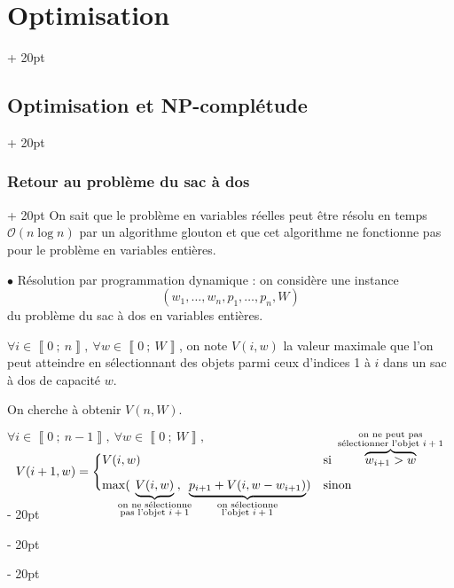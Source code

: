 \documentclass[a4paper, 12pt, twoside]{article}
\newcommand{\nset}[2]{\left\llbracket #1\ ;\ #2 \right\rrbracket}
\newcommand{\ind}[1][20pt]{\advance\leftskip + #1}
\newcommand{\deind}[1][20pt]{\advance\leftskip - #1}
\newenvironment{indt}[2][20pt]{#2 \par \ind[#1]}{\par \deind} %
\newcommand{\1}{\mathbbm 1}
\begin{document}
\begin{indt}{\section{Optimisation}}
\begin{indt}{\subsection{Optimisation et \textbf{NP}-complétude}}
            \vspace{12pt}
            
            \begin{indt}{\subsubsection{Retour au problème du sac à dos}}
                On sait que le problème en variables réelles peut être résolu en temps $\mathcal O(n\log n)$ par un algorithme glouton et que cet algorithme ne fonctionne pas pour le problème en variables entières.

                \vspace{12pt}
                
                $\bullet$ Résolution par programmation dynamique : on considère une instance
                \[
                    (w_1, \ldots, w_n, p_1, \ldots, p_n, W)
                \]
                du problème du sac à dos en variables entières.

                $\forall i \in \nset 0 n,\ \forall w \in \nset 0 W$, on note $V(i, w)$ la valeur maximale que l'on peut atteindre en sélectionnant des objets parmi ceux d'indices 1 à $i$ dans un sac à dos de capacité $w$.

                On cherche à obtenir $V(n, W)$.

                $
                    \forall i \in \nset 0 {n - 1},\
                    \forall w \in \nset 0 W,\
                $
                \[
                    V(i + 1, w) =
                    \begin{cases}
                        \vspace{-32pt}
                        \\
                        V(i, w)
                        & \text{si}\ \overbrace{w_{i + 1} > w}^{\substack{\text{on ne peut pas} \\ \text{sélectionner l'objet $i + 1$}}}
                        \vspace{6pt}
                        \\
                        \max(\!\!\!\!\!\! \underbrace{V(i, w)}_{\substack{\text{on ne sélectionne} \\ \text{pas l'objet $i + 1$}}}\!\!\!\!\!\!\!,\ \, \underbrace{p_{i + 1} + V(i, w - w_{i + 1})}_{\substack{\text{on sélectionne} \\ \text{l'objet $i + 1$}}})
                        & \text{sinon}
                        \vspace{-21pt}
                    \end{cases}
                \]


\end{indt}
\end{indt}
\end{indt}
\end{document}
